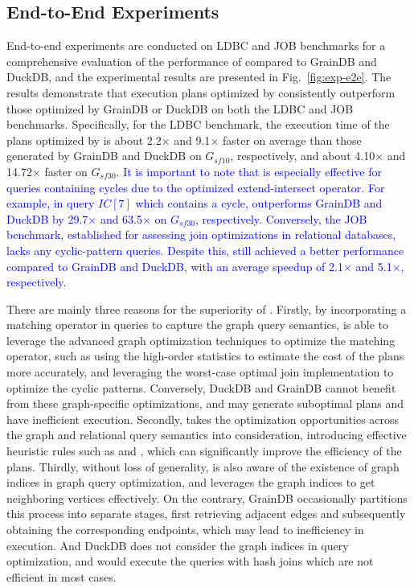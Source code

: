 \subsection{End-to-End Experiments}
\label{sec:experiment-e2e}

End-to-end experiments are conducted on LDBC and JOB benchmarks for a comprehensive evaluation of the performance of \name compared to GrainDB and DuckDB,
and the experimental results are presented in Fig.~\ref{fig:exp-e2e}.
The results demonstrate that execution plans optimized by \name consistently outperform those optimized by GrainDB or DuckDB on both the LDBC and JOB benchmarks.
Specifically, for the LDBC benchmark, the execution time of the plans optimized by \name is about 2.2$\times$ and 9.1$\times$ faster on average than those generated by GrainDB and DuckDB on $G_{sf10}$, respectively, and about 4.10$\times$ and 14.72$\times$ faster on $G_{sf30}$.
\textcolor{blue}{
It is important to note that \name is especially effective for queries containing cycles due to the optimized extend-intersect operator.
For example, in query $IC[7]$ which contains a cycle, \name outperforms GrainDB and DuckDB by 29.7$\times$ and 63.5$\times$ on $G_{sf30}$, respectively.
Conversely, the JOB benchmark, established for assessing join optimizations in relational databases, lacks any cyclic-pattern queries. Despite this, \name still achieved a better performance compared to GrainDB and DuckDB, with an average speedup of 2.1$\times$ and 5.1$\times$, respectively.
}

There are mainly three reasons for the superiority of \name.
Firstly, by incorporating a matching operator in \spjm queries to capture the graph query semantics, \name is able to leverage the advanced graph optimization techniques to optimize the matching operator, such as using the high-order statistics to estimate the cost of the plans more accurately, and leveraging the worst-case optimal join implementation to optimize the cyclic patterns.
Conversely, DuckDB and GrainDB cannot benefit from these graph-specific optimizations, and may generate suboptimal plans and have inefficient execution.
Secondly, \name takes the optimization opportunities across the graph and relational query semantics into consideration, introducing effective heuristic rules such as \filterrule and \joinfuserule, which can significantly improve the efficiency of the plans.
Thirdly, without loss of generality, \name is also aware of the existence of graph indices in graph query optimization, and leverages the graph indices to get neighboring vertices effectively.
On the contrary, GrainDB occasionally partitions this process into separate stages, first retrieving adjacent edges and subsequently obtaining the corresponding endpoints, which may lead to inefficiency in execution. And DuckDB does not consider the graph indices in query optimization, and would execute the queries with hash joins which are not efficient in most cases.

